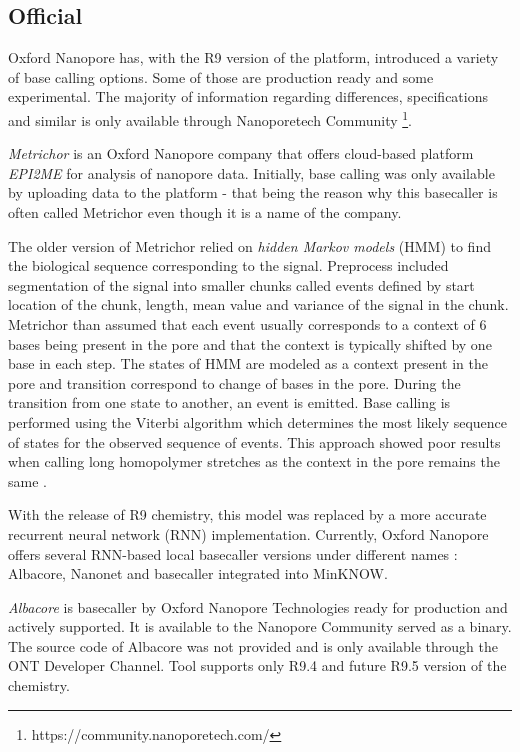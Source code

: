 \documentclass[times, utf8, diplomski, numeric, english]{fer}
\begin{document}
\subsection{Official}
Oxford Nanopore has, with the R9 version of the platform, introduced a variety of base calling options. Some of those are production ready and some experimental. The majority of information regarding differences, specifications and similar is only available through Nanoporetech Community \footnote{https://community.nanoporetech.com/}.


\textit{Metrichor} is an Oxford Nanopore company that offers cloud-based platform \textit{EPI2ME} for analysis of nanopore data. 
Initially, base calling was only available by uploading data to the platform - that being the reason why this basecaller is often called Metrichor even though it is a name of the company.

The older version of Metrichor relied on \textit{hidden Markov models} (HMM) to find the biological sequence corresponding to the signal. Preprocess included segmentation of the signal into smaller chunks called events defined by start location of the chunk, length, mean value and variance of the signal in the chunk. Metrichor than assumed that each event usually corresponds to a context of 6 bases being present in the pore and that the context is typically shifted by one base in each step. 
The states of HMM are modeled as a context present in the pore and transition correspond to change of bases in the pore. During the transition from one state to another, an event is emitted. Base calling is performed using the Viterbi algorithm which determines the most likely sequence of states for the observed sequence of events. This approach showed poor results when calling long homopolymer stretches as the context in the pore remains the same \cite{homopolymers}.

With the release of R9 chemistry, this model was replaced by a more accurate recurrent neural network (RNN) implementation. Currently, Oxford Nanopore offers several RNN-based local basecaller versions under different names \cite{ont-basecallers}: Albacore, Nanonet and basecaller integrated into MinKNOW.  

\textit{Albacore} is basecaller by Oxford Nanopore Technologies ready for production and actively supported.
It is available to the Nanopore Community served as a binary. The source code of Albacore was not provided and is only available through the ONT Developer Channel. Tool supports only R9.4 and future R9.5 version of the chemistry.
\end{document}
